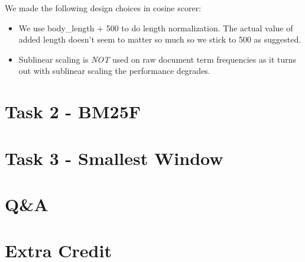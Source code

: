 \documentclass{article}
\begin{document}
We made the following design choices in cosine scorer:

\begin{itemize}
    \item We use body\_length + 500 to do length normalization. The actual value of added length doesn't seem to matter so much so we stick to 500 as suggested.
    \item Sublinear scaling is \emph{NOT} used on raw document term frequencies as it turns out with sublinear scaling the performance degrades.
\end{itemize}

\section{Task 2 - BM25F}

\section{Task 3 - Smallest Window}

\section{Q\&A}

\section{Extra Credit}
\end{document}

